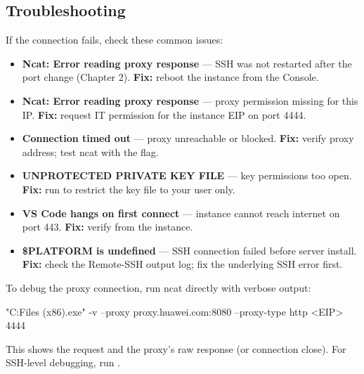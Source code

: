 \documentclass{guide}
\begin{document}
\subsection{Troubleshooting}

If the connection fails, check these common issues:

\begin{itemize}
  \item \textbf{Ncat: Error reading proxy response} --- SSH was not restarted
        after the port change (Chapter 2). \textbf{Fix:} reboot the instance
        from the Console.
  \item \textbf{Ncat: Error reading proxy response} --- proxy
         permission missing for this IP.
        \textbf{Fix:} request IT permission for the instance EIP on port 4444.
  \item \textbf{Connection timed out} --- proxy unreachable or
         blocked. \textbf{Fix:} verify proxy address; test
        ncat with the  flag.
  \item \textbf{UNPROTECTED PRIVATE KEY FILE} --- key permissions too open.
        \textbf{Fix:} run  to restrict the key file to your
        user only.
  \item \textbf{VS Code hangs on first connect} --- instance cannot reach
        internet on port 443. \textbf{Fix:} verify
         from the
        instance.
  \item \textbf{\$PLATFORM is undefined} --- SSH connection failed before
        server install. \textbf{Fix:} check the Remote-SSH output log; fix the
        underlying SSH error first.
\end{itemize}

\begin{infobox}
To debug the proxy connection, run ncat directly with verbose output:
\begin{code}
"C:\Program Files (x86)\Nmap\ncat.exe" -v --proxy proxy.huawei.com:8080 --proxy-type http <EIP> 4444
\end{code}
This shows the  request and the proxy's raw response (or
connection close). For SSH-level debugging, run
.
\end{infobox}
\end{document}
